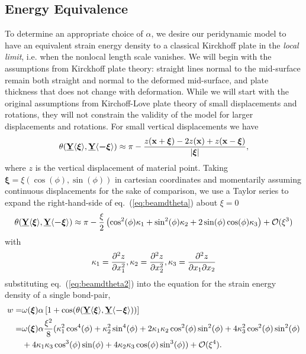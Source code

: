 \documentclass[preprint,review,12pt]{elsarticle}
\newcommand\vstate[3]{%
	\mathbf{\underline{#1}}%
	\ifstrempty{#2}{}{[#2]}%
	\ifstrempty{#3}{}{\langle #3 \rangle}}
\begin{document}
\subsection{Energy Equivalence}
%
To determine an appropriate choice of $\alpha$, we desire our peridynamic model to have an equivalent strain energy density to a classical Kirckhoff plate in the \emph{local limit}, i.e. when the nonlocal length scale vanishes.  
We will begin with the assumptions from Kirckhoff plate theory: straight lines normal to the mid-surface remain both straight and normal to the deformed mid-surface, and plate thickness that does not change with deformation. 
While we will start with the original assumptions from Kirchoff-Love plate theory of small displacements and rotations, they will not constrain the validity of the model for larger displacements and rotations. 
For small vertical displacements we have
%
\begin{equation}
    \theta(\vstate{Y}{}{\boldsymbol{\xi}},\vstate{Y}{}{\boldsymbol{-\xi}}) \approx \pi-\frac{z(\mathbf{x}+\boldsymbol{\xi})-2z(\mathbf{x})+z(\mathbf{x}-\boldsymbol{\xi})}{|\boldsymbol{\xi}|},
    \label{eq:beamdtheta}
\end{equation}
%
where $z$ is the vertical displacement of material point.  
Taking \(\boldsymbol{\xi}=\xi (\cos(\phi),\sin(\phi))\) in cartesian coordinates and momentarily assuming continuous displacements for the sake of comparison, we use a Taylor series to expand the right-hand-side of eq.~(\ref{eq:beamdtheta}) about \(\xi = 0\) 
%
\begin{equation}
    \theta(\vstate{Y}{}{\boldsymbol{\xi}},\vstate{Y}{}{\boldsymbol{-\xi}}) \approx \pi-\frac{\xi}{2} \left(\cos^2(\phi) \kappa_1+\sin^2(\phi) \kappa_2+2\sin(\phi)\cos(\phi)\kappa_3\right)+\mathcal{O}(\xi^3)
    \label{eq:beamdtheta2}
\end{equation}
%
with
%
\begin{equation}
    \kappa_1=\frac{\partial^2 z}{\partial x_1^2}, \kappa_2= \frac{\partial^2 z}{\partial x_2^2}, \kappa_3=\frac{\partial^2 z}{\partial x_1\partial x_2}\notag
\end{equation}
%
substituting eq.~(\ref{eq:beamdtheta2}) into the equation for the strain energy density of a single bond-pair,
%
\begin{align}
    w =& \omega(\boldsymbol{\xi}) \alpha \left[1+\cos(\theta(\vstate{Y}{}{\boldsymbol{\xi}},\vstate{Y}{}{\boldsymbol{-\xi}}) ) \right] \notag \\
    =& \omega(\boldsymbol{\xi}) \alpha\frac{\xi^2}{8}(\kappa_1^2\cos^4(\phi)+\kappa_2^2\sin^4(\phi)+2\kappa_1\kappa_2\cos^2(\phi)\sin^2(\phi)+4\kappa_3^2\cos^2(\phi)\sin^2(\phi) \notag \\
    & +4\kappa_1\kappa_3\cos^3(\phi)\sin(\phi)+4\kappa_2\kappa_3\cos(\phi)\sin^3(\phi))+\mathcal{O}(\xi^4).\notag
\end{align}
\end{document}
